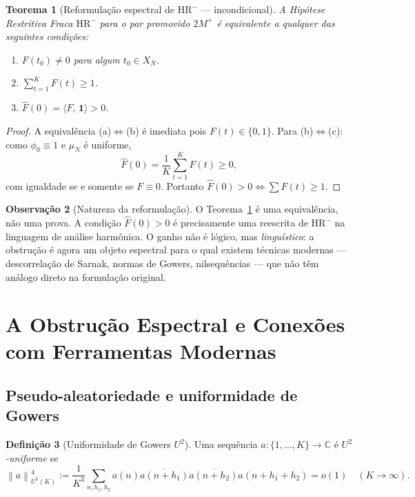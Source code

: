 \documentclass[12pt,a4paper]{article}
\newtheorem{theorem}{Teorema}[section]
\theoremstyle{definition}
\newtheorem{definition}[theorem]{Definição}
\newtheorem{remark}[theorem]{Observação}
\newcommand{\C}{\mathbb{C}}
\newcommand{\HRm}{\mathrm{HR}^{-}}
\newcommand{\norm}[1]{\left\| #1 \right\|}
\newcommand{\ip}[2]{\langle #1,\, #2 \rangle}
\begin{document}
	\begin{theorem}[Reformulação espectral de $\HRm$ — incondicional]
		\label{thm:reformulacao}
		A Hipótese Restritiva Fraca $\HRm$ para o par promovido $2M^+$ é
		equivalente a qualquer das seguintes condições:
		\begin{enumerate}[label=(\alph*)]
			\item $F(t_0) \neq 0$ para algum $t_0 \in X_N$.
			\item $\displaystyle\sum_{t=1}^{K} F(t) \geq 1$.
			\item $\widehat{F}(0) = \ip{F}{\mathbf{1}} > 0$.
		\end{enumerate}
	\end{theorem}
	
	\begin{proof}
		A equivalência (a)$\Leftrightarrow$(b) é imediata pois $F(t) \in
		\{0,1\}$. Para (b)$\Leftrightarrow$(c): como $\phi_0 \equiv 1$ e
		$\mu_N$ é uniforme,
		\[
		\widehat{F}(0) = \frac{1}{K}\sum_{t=1}^K F(t) \geq 0,
		\]
		com igualdade se e somente se $F \equiv 0$. Portanto
		$\widehat{F}(0) > 0 \Leftrightarrow \sum F(t) \geq 1$.
	\end{proof}
	
	\begin{remark}[Natureza da reformulação]
		\label{rem:tautologia}
		O Teorema~\ref{thm:reformulacao} é uma equivalência, não uma prova.
		A condição $\widehat{F}(0) > 0$ é precisamente uma reescrita de $\HRm$
		na linguagem de análise harmônica. O ganho não é lógico, mas
		\emph{linguístico}: a obstrução é agora um objeto espectral para o
		qual existem técnicas modernas — descorrelação de Sarnak, normas de
		Gowers, nilsequências — que não têm análogo direto na formulação
		original.
	\end{remark}
	
	\section{A Obstrução Espectral e Conexões com Ferramentas Modernas}
	\label{sec:obstrucao}
	
	\subsection{Pseudo-aleatoriedade e uniformidade de Gowers}
	
	\begin{definition}[Uniformidade de Gowers $U^2$]
		Uma sequência $a: \{1,\ldots,K\} \to \C$ é \emph{$U^2$-uniforme} se
		\[
		\norm{a}_{U^2(K)}^4 := \frac{1}{K^3}\sum_{n,h_1,h_2}
		a(n)\overline{a(n+h_1)}\overline{a(n+h_2)}a(n+h_1+h_2) = o(1)
		\quad (K \to \infty).
		\]
	\end{definition}
	
\end{document}

